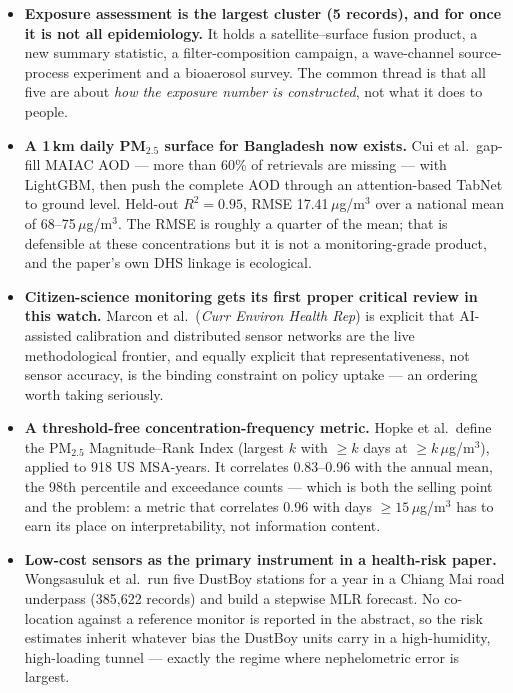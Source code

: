 \documentclass[10pt]{article}
\begin{document}
\footnotesize
\begin{itemize}
\item \textbf{Exposure assessment is the largest cluster (5 records), and for once it is
not all epidemiology.} It holds a satellite--surface fusion product, a new summary
statistic, a filter-composition campaign, a wave-channel source-process experiment and a
bioaerosol survey. The common thread is that all five are about \emph{how the exposure
number is constructed}, not what it does to people.

\item \textbf{A 1\,km daily PM$_{2.5}$ surface for Bangladesh now exists.} Cui et al.\
gap-fill MAIAC AOD --- more than 60\% of retrievals are missing --- with LightGBM, then
push the complete AOD through an attention-based TabNet to ground level. Held-out
$R^2=0.95$, RMSE 17.41\,$\mu$g/m$^3$ over a national mean of 68--75\,$\mu$g/m$^3$. The
RMSE is roughly a quarter of the mean; that is defensible at these concentrations but it
is not a monitoring-grade product, and the paper's own DHS linkage is ecological.

\item \textbf{Citizen-science monitoring gets its first proper critical review in this
watch.} Marcon et al.\ (\textit{Curr Environ Health Rep}) is explicit that AI-assisted
calibration and distributed sensor networks are the live methodological frontier, and
equally explicit that representativeness, not sensor accuracy, is the binding constraint
on policy uptake --- an ordering worth taking seriously.

\item \textbf{A threshold-free concentration-frequency metric.} Hopke et al.\ define the
PM$_{2.5}$ Magnitude--Rank Index (largest $k$ with $\geq k$ days at $\geq k$\,$\mu$g/m$^3$),
applied to 918 US MSA-years. It correlates 0.83--0.96 with the annual mean, the 98th
percentile and exceedance counts --- which is both the selling point and the problem: a
metric that correlates 0.96 with days $\geq15$\,$\mu$g/m$^3$ has to earn its place on
interpretability, not information content.

\item \textbf{Low-cost sensors as the primary instrument in a health-risk paper.}
Wongsasuluk et al.\ run five DustBoy stations for a year in a Chiang Mai road underpass
(385{,}622 records) and build a stepwise MLR forecast. No co-location against a reference
monitor is reported in the abstract, so the risk estimates inherit whatever bias the
DustBoy units carry in a high-humidity, high-loading tunnel --- exactly the regime where
nephelometric error is largest.


\end{itemize}
\end{document}
